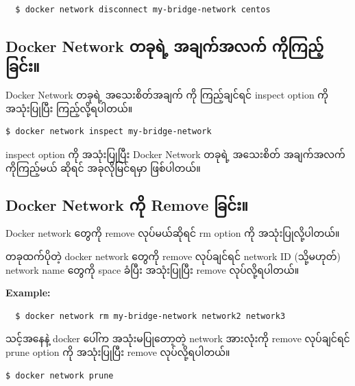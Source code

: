 \begin{verbatim}
  $ docker network disconnect my-bridge-network centos
\end{verbatim}

\hypertarget{docker-network-ux1010ux1001ux102fux101bux1032ux1037-ux1021ux1001ux103bux1000ux103aux1021ux101cux1000ux103a-ux1000ux102dux102fux1000ux103cux100aux1037ux103aux1001ux103cux1004ux103aux1038}{%
\subsection{Docker Network တခုရဲ့ အချက်အလက်
ကိုကြည့်ခြင်း။}\label{docker-network-ux1010ux1001ux102fux101bux1032ux1037-ux1021ux1001ux103bux1000ux103aux1021ux101cux1000ux103a-ux1000ux102dux102fux1000ux103cux100aux1037ux103aux1001ux103cux1004ux103aux1038}}

Docker Network တခုရဲ့ အသေးစိတ်အချက် ကို ကြည့်ချင်ရင် inspect option ကို
အသုံးပြုပြီး ကြည့်လို့ရပါတယ်။

\begin{verbatim}
$ docker network inspect my-bridge-network
\end{verbatim}

inspect option ကို အသုံးပြုပြီး Docker Network တခုရဲ့ အသေးစိတ်
အချက်အလက်ကိုကြည့်မယ် ဆိုရင် အခုလိုမြင်ရမှာ ဖြစ်ပါတယ်။

\hypertarget{docker-network-ux1000ux102dux102f-remove-ux1001ux103cux1004ux103aux1038}{%
\subsection{Docker Network ကို Remove
ခြင်း။}\label{docker-network-ux1000ux102dux102f-remove-ux1001ux103cux1004ux103aux1038}}

Docker network တွေကို remove လုပ်မယ်ဆိုရင် rm option ကို
အသုံးပြုလို့ပါတယ်။

တခုထက်ပိုတဲ့ docker network တွေကို remove လုပ်ချင်ရင် network ID
(သို့မဟုတ်) network name တွေကို space ခံပြီး အသုံးပြုပြီး remove
လုပ်လို့ရပါတယ်။

\textbf{Example:}

\begin{verbatim}
  $ docker network rm my-bridge-network network2 network3
\end{verbatim}

သင့်အနေနဲ့ docker ပေါ်က အသုံးမပြုတော့တဲ့ network အားလုံးကို remove
လုပ်ချင်ရင် prune option ကို အသုံးပြုပြီး remove လုပ်လို့ရပါတယ်။

\begin{verbatim}
$ docker network prune
\end{verbatim}

